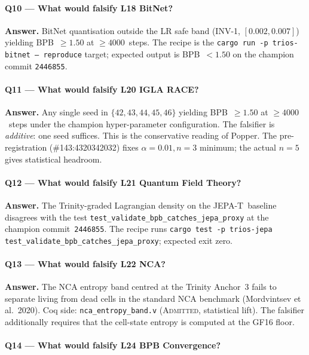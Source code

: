 \paragraph{Q10 — What would falsify L18 BitNet?}

\textbf{Answer.} BitNet quantisation outside the LR safe band (INV-1,
\([0.002, 0.007]\)) yielding BPB~\(\ge 1.50\) at \(\ge 4000\)~steps. The
recipe is the \texttt{cargo run -p trios-bitnet -- reproduce} target;
expected output is BPB~\(< 1.50\) on the champion commit \texttt{2446855}.

\paragraph{Q11 — What would falsify L20 IGLA RACE?}

\textbf{Answer.} Any single seed in \(\{42, 43, 44, 45, 46\}\) yielding
BPB~\(\ge 1.50\) at \(\ge 4000\)~steps under the champion hyper-parameter
configuration. The falsifier is \emph{additive}: one seed suffices. This
is the conservative reading of Popper. The pre-registration
(\#143:4320342032) fixes \(\alpha = 0.01, n = 3\) minimum; the actual
\(n = 5\) gives statistical headroom.

\paragraph{Q12 — What would falsify L21 Quantum Field Theory?}

\textbf{Answer.} The Trinity-graded Lagrangian density on the
JEPA-T~baseline disagrees with the test
\texttt{test\_validate\_bpb\_catches\_jepa\_proxy} at the champion
commit~\texttt{2446855}. The recipe runs \texttt{cargo test -p trios-jepa
test\_validate\_bpb\_catches\_jepa\_proxy}; expected exit zero.

\paragraph{Q13 — What would falsify L22 NCA?}

\textbf{Answer.} The NCA entropy band centred at the Trinity Anchor~3
fails to separate living from dead cells in the standard NCA benchmark
(Mordvintsev et al.~2020). Coq side: \texttt{nca\_entropy\_band.v}
(\textsc{Admitted}, statistical lift). The falsifier additionally
requires that the cell-state entropy is computed at the GF16 floor.

\paragraph{Q14 — What would falsify L24 BPB Convergence?}

